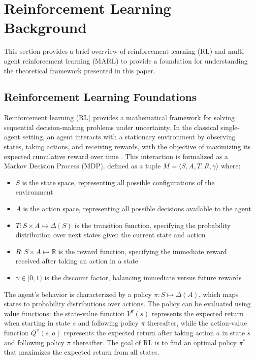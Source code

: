 \setcounter{proposition}{0}
\setcounter{assumption}{0}
\setcounter{lemma}{0}
\setcounter{theorem}{0}

\chapter{Reinforcement Learning Background}

\label{appendix:rl_details}
This section provides a brief overview of reinforcement learning (RL) and multi-agent reinforcement learning (MARL) to provide a foundation for understanding the theoretical framework presented in this paper.

\section{Reinforcement Learning Foundations}

Reinforcement learning (RL) provides a mathematical framework for solving sequential decision-making problems under uncertainty. In the classical single-agent setting, an agent interacts with a stationary environment by observing states, taking actions, and receiving rewards, with the objective of maximizing its expected cumulative reward over time \cite{sutton2018reinforcement}. This interaction is formalized as a Markov Decision Process (MDP), defined as a tuple $M = \langle S, A, T, R, \gamma \rangle$ where:

\begin{itemize}
    \item $S$ is the state space, representing all possible configurations of the environment
    \item $A$ is the action space, representing all possible decisions available to the agent
    \item $T: S \times A \mapsto \Delta(S)$ is the transition function, specifying the probability distribution over next states given the current state and action
    \item $R: S \times A \mapsto \mathbb{R}$ is the reward function, specifying the immediate reward received after taking an action in a state
    \item $\gamma \in [0, 1)$ is the discount factor, balancing immediate versus future rewards
\end{itemize}

The agent's behavior is characterized by a policy $\pi: S \mapsto \Delta(A)$, which maps states to probability distributions over actions. The policy can be evaluated using value functions: the state-value function $V^\pi(s)$ represents the expected return when starting in state $s$ and following policy $\pi$ thereafter, while the action-value function $Q^\pi(s, a)$ represents the expected return after taking action $a$ in state $s$ and following policy $\pi$ thereafter. The goal of RL is to find an optimal policy $\pi^*$ that maximizes the expected return from all states.

